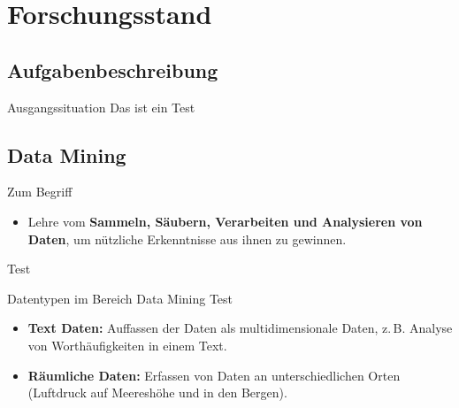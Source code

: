 \documentclass[t,8pt]{beamer}
\begin{document}
\section{Forschungsstand}
\subsection{Aufgabenbeschreibung}

\begin{frame}{Ausgangssituation}
Das ist ein Test
\end{frame}

\subsection{Data Mining}

\begin{frame}{Zum Begriff}

\begin{itemize}
\item \glqq{}Lehre vom \textbf{Sammeln, Säubern, Verarbeiten und Analysieren     von Daten}, um nützliche Erkenntnisse aus ihnen zu gewinnen.\grqq{}
\end{itemize}

\end{frame}


\begin{frame}{}
Test
\end{frame}

\begin{frame}{Datentypen im Bereich Data Mining}
Test
\end{frame}

\begin{frame}{}
\begin{itemize}
\item \textbf{Text Daten:} Auffassen der Daten als multidimensionale Daten,  z.\,B. Analyse von Worthäufigkeiten in einem Text.
\end{itemize}
\end{frame}

\begin{frame}{}

\begin{itemize}
\item \textbf{Räumliche Daten:} Erfassen von Daten an unterschiedlichen Orten (Luftdruck auf Meereshöhe und in den Bergen).
\end{itemize}
\end{frame}
\end{document}
